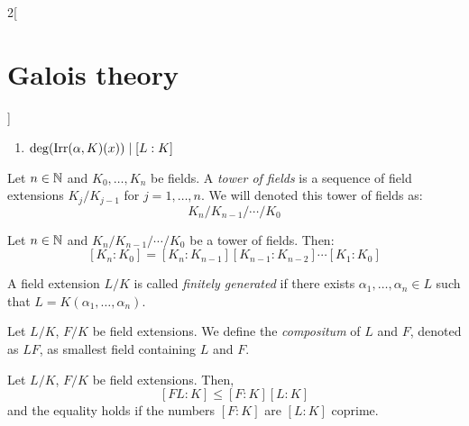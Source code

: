 \documentclass[../../../main.tex]{subfiles}
\begin{document}
\begin{multicols}{2}[\section{Galois theory}]
\begin{prop}
\begin{enumerate}
      \item $\deg(\operatorname{Irr}(\alpha,K)(x))\mid [L:K]$
    \end{enumerate}
  \end{prop}
  \begin{definition}
    Let $n\in\mathbb{N}$ and $K_0,\ldots,K_n$ be fields. A \emph{tower of fields} is a sequence of field extensions $K_j/K_{j-1}$ for $j=1,\ldots,n$. We will denoted this tower of fields as: $$K_n/K_{n-1}/\cdots/K_0$$
  \end{definition}
  \begin{corollary}
    Let $n\in\mathbb{N}$ and $K_n/K_{n-1}/\cdots/K_0$ be a tower of fields. Then: $$[K_n:K_0]=[K_n:K_{n-1}][K_{n-1}:K_{n-2}]\cdots[K_1:K_0]$$
  \end{corollary}
  \begin{definition}
    A field extension $L/K$ is called \emph{finitely generated} if there exists $\alpha_1,\ldots,\alpha_n\in L$ such that $L=K(\alpha_1,\ldots,\alpha_n)$.
  \end{definition}
  \begin{definition}
    Let $L/K$, $F/K$ be field extensions. We define the \emph{compositum} of $L$ and $F$, denoted as $LF$, as smallest field containing $L$ and $F$.
  \end{definition}
  \begin{prop}
    Let $L/K$, $F/K$ be field extensions. Then, $$[FL:K]\leq[F:K][L:K]$$ and the equality holds if the numbers $[F:K]$ are $[L:K]$ coprime.
  \end{prop}

\end{multicols}
\end{document}
